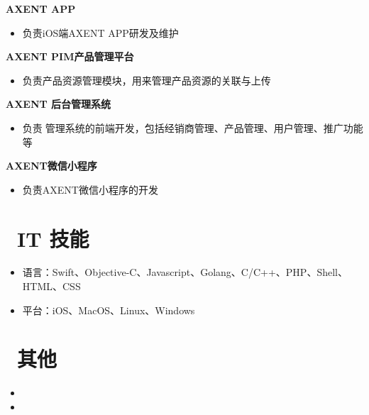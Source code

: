 \documentclass{resume}
\begin{document}

\begin{onehalfspacing}
    \textbf{AXENT APP}
    \begin{itemize}
        \item 负责iOS端AXENT APP研发及维护
    \end{itemize}
\end{onehalfspacing}

\begin{onehalfspacing}
    \textbf{AXENT PIM产品管理平台}
    \begin{itemize}
        \item 负责产品资源管理模块，用来管理产品资源的关联与上传
    \end{itemize}
\end{onehalfspacing}

\begin{onehalfspacing}
    \textbf{AXENT 后台管理系统}
    \begin{itemize}
        \item 负责管理系统的前端开发，包括经销商管理、产品管理、用户管理、推广功能等
    \end{itemize}
\end{onehalfspacing}

\begin{onehalfspacing}
    \textbf{AXENT微信小程序}
    \begin{itemize}
        \item 负责AXENT微信小程序的开发
    \end{itemize}
\end{onehalfspacing}

\section{\faCogs\ IT 技能}
\begin{itemize}[parsep=0.5ex]
    \item 语言：Swift、Objective-C、Javascript、Golang、C/C++、PHP、Shell、HTML、CSS
    \item 平台：iOS、MacOS、Linux、Windows
\end{itemize}

\section{\faInfoCircle\ 其他}
\begin{itemize}[parsep=0.5ex]
    \item {}
    \item {}
\end{itemize}

\end{document}
